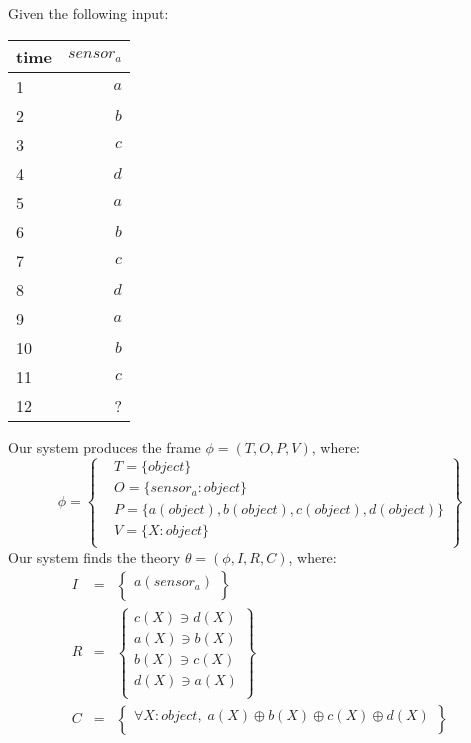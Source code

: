 
Given the following input:
\begin{table}[ht!]
\begin{center}
\begin{tabular}{|l|r|}
\hline
time & $\mathit{sensor}_a$\\
\hline
1 & $\mathit{a}$ \\
2 & $\mathit{b}$ \\
3 & $\mathit{c}$ \\
4 & $\mathit{d}$ \\
5 & $\mathit{a}$ \\
6 & $\mathit{b}$ \\
7 & $\mathit{c}$ \\
8 & $\mathit{d}$ \\
9 & $\mathit{a}$ \\
10 & $\mathit{b}$ \\
11 & $\mathit{c}$ \\
12 & ? \\
\hline
\end{tabular}
\end{center}
\end{table}

Our system produces the frame $\phi = (T, O, P, V)$, where:
\begin{equation*}
\phi = \left \{
\begin{aligned}
& T = \{ 
object
\}\\
& O = \{
\mathit{sensor}_a: object
\}\\
& P = \{
\mathit{a}(object),\mathit{b}(object),\mathit{c}(object),\mathit{d}(object)
\}\\
& V = \{
X: object
\}\\
\end{aligned}\right\}
\end{equation*}
Our system finds the theory $\theta = (\phi, I, R, C)$, where:
\begin{eqnarray*}
I & = & \left\{ \begin{array}{l}
\mathit{a}(\mathit{sensor}_a)\\
\end{array}\right\}\\
R & = &  \left\{ \begin{array}{l}
\mathit{c}(\mathit{X}) \ni \mathit{d}(\mathit{X})\\
\mathit{a}(\mathit{X}) \ni \mathit{b}(\mathit{X})\\
\mathit{b}(\mathit{X}) \ni \mathit{c}(\mathit{X})\\
\mathit{d}(\mathit{X}) \ni \mathit{a}(\mathit{X})\\
\end{array}\right\}\\
C & = & \left\{ \begin{array}{l}
\forall X : object,\;\mathit{a}(X) \oplus \mathit{b}(X) \oplus \mathit{c}(X) \oplus \mathit{d}(X)\\
\end{array}\right\}\\
\end{eqnarray*}

